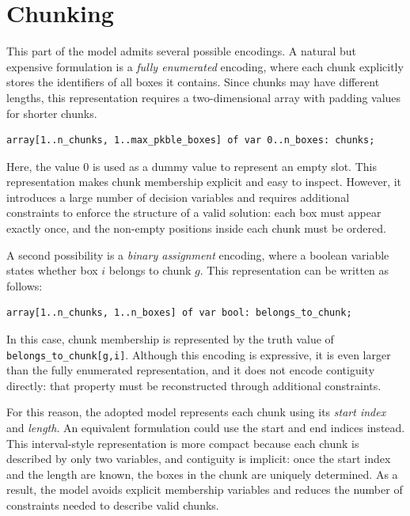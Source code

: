 \section{Chunking}
\label{sec:model}
This part of the model admits several possible encodings. A natural but
expensive formulation is a \emph{fully enumerated} encoding, where each chunk
explicitly stores the identifiers of all boxes it contains. Since chunks may
have different lengths, this representation requires a two-dimensional
array with padding values for shorter chunks.
\vspace{0.5cm}
\begin{lstlisting}
array[1..n_chunks, 1..max_pkble_boxes] of var 0..n_boxes: chunks;
\end{lstlisting}
\vspace{0.5cm}
Here, the value \(0\) is used as a dummy value to represent an empty slot.
This representation makes chunk membership explicit and easy to inspect.
However, it introduces a large number of decision variables and requires
additional constraints to enforce the structure of a valid solution: each
box must appear exactly once, and the non-empty positions inside each
chunk must be ordered.

A second possibility is a \emph{binary assignment} encoding, where a boolean
variable states whether box \(i\) belongs to chunk \(g\). This representation
can be written as follows:

\vspace{0.5cm}
\begin{lstlisting}
array[1..n_chunks, 1..n_boxes] of var bool: belongs_to_chunk;
\end{lstlisting}
\vspace{0.5cm}
In this case, chunk membership is represented by the truth value of
\texttt{belongs\_to\_chunk[g,i]}. Although this encoding is expressive, it
is even larger than the fully enumerated representation, and it does not
encode contiguity directly: that property must be reconstructed through
additional constraints.

For this reason, the adopted model represents each chunk using its
\emph{start index} and \emph{length}. An equivalent formulation could use
the start and end indices instead. This interval-style representation is
more compact because each chunk is described by only two variables, and
contiguity is implicit: once the start index and the length are known,
the boxes in the chunk are uniquely determined. As a result, the model
avoids explicit membership variables and reduces the number of constraints
needed to describe valid chunks.

